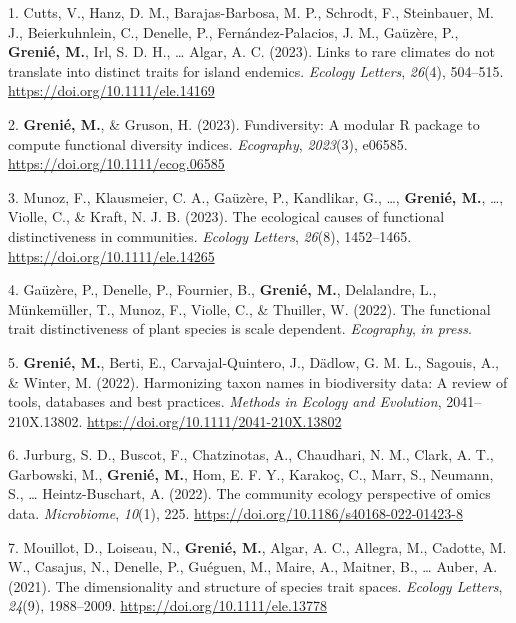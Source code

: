 \documentclass[10pt,a4paper,]{article}
\newlength{\cslhangindent}
\newenvironment{CSLReferences}[2] %
 {\begin{list}{}{%
  \setlength{\itemindent}{0pt}
  \setlength{\leftmargin}{0pt}
  \setlength{\parsep}{0pt}
  \ifodd #1
   \setlength{\leftmargin}{\cslhangindent}
   \setlength{\itemindent}{-1\cslhangindent}
  \fi
  \setlength{\itemsep}{#2\baselineskip}}}
 {\end{list}}
\begin{document}
\label{refs-86c4a80be2a3d18425d3a7c99120529a}
\begin{CSLReferences}{1}{1}
1. Cutts, V., Hanz, D. M., Barajas-Barbosa, M. P., Schrodt, F.,
Steinbauer, M. J., Beierkuhnlein, C., Denelle, P., Fernández-Palacios,
J. M., Gaüzère, P., \textbf{Grenié, M.}, Irl, S. D. H., \ldots{} Algar,
A. C. (2023). Links to rare climates do not translate into distinct
traits for island endemics. \emph{Ecology Letters}, \emph{26}(4),
504--515. \url{https://doi.org/10.1111/ele.14169}

2. \textbf{Grenié, M.}, \& Gruson, H. (2023). Fundiversity: A modular R
package to compute functional diversity indices. \emph{Ecography},
\emph{2023}(3), e06585. \url{https://doi.org/10.1111/ecog.06585}

3. Munoz, F., Klausmeier, C. A., Gaüzère, P., Kandlikar, G., \ldots,
\textbf{Grenié, M.}, \ldots, Violle, C., \& Kraft, N. J. B. (2023). The
ecological causes of functional distinctiveness in communities.
\emph{Ecology Letters}, \emph{26}(8), 1452--1465.
\url{https://doi.org/10.1111/ele.14265}

4. Gaüzère, P., Denelle, P., Fournier, B., \textbf{Grenié, M.},
Delalandre, L., Münkemüller, T., Munoz, F., Violle, C., \& Thuiller, W.
(2022). The functional trait distinctiveness of plant species is scale
dependent. \emph{Ecography}, \emph{in press}.

5. \textbf{Grenié, M.}, Berti, E., Carvajal-Quintero, J., Dädlow, G. M.
L., Sagouis, A., \& Winter, M. (2022). Harmonizing taxon names in
biodiversity data: A review of tools, databases and best practices.
\emph{Methods in Ecology and Evolution}, 2041--210X.13802.
\url{https://doi.org/10.1111/2041-210X.13802}

6. Jurburg, S. D., Buscot, F., Chatzinotas, A., Chaudhari, N. M., Clark,
A. T., Garbowski, M., \textbf{Grenié, M.}, Hom, E. F. Y., Karakoç, C.,
Marr, S., Neumann, S., \ldots{} Heintz-Buschart, A. (2022). The
community ecology perspective of omics data. \emph{Microbiome},
\emph{10}(1), 225. \url{https://doi.org/10.1186/s40168-022-01423-8}

7. Mouillot, D., Loiseau, N., \textbf{Grenié, M.}, Algar, A. C.,
Allegra, M., Cadotte, M. W., Casajus, N., Denelle, P., Guéguen, M.,
Maire, A., Maitner, B., \ldots{} Auber, A. (2021). The dimensionality
and structure of species trait spaces. \emph{Ecology Letters},
\emph{24}(9), 1988--2009. \url{https://doi.org/10.1111/ele.13778}


\end{CSLReferences}
\end{document}
